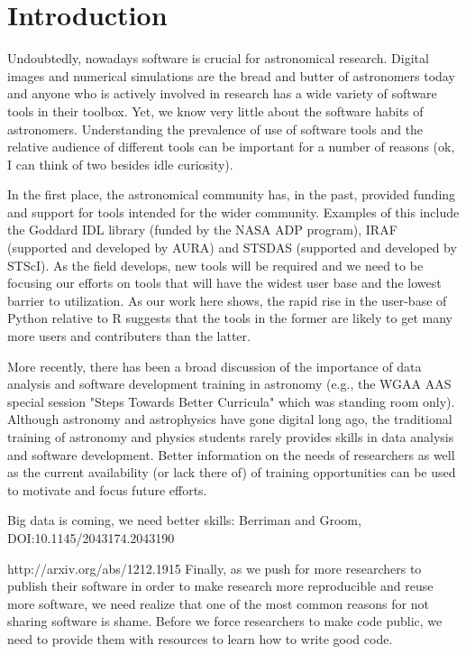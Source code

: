 \section{Introduction}

Undoubtedly, nowadays software is crucial for astronomical research. Digital images and numerical simulations are the bread and butter of astronomers today and anyone who is actively involved in research has a wide variety of software tools in their toolbox. Yet, we know very little about the software habits of astronomers. Understanding the prevalence of use of software tools and the relative audience of different tools can be important for a number of reasons (ok, I can think of two besides idle curiosity).

In the first place, the astronomical community has, in the past, provided funding and support for tools intended for the wider community. Examples of this include the Goddard IDL library (funded by the NASA ADP program), IRAF (supported and developed by AURA) and STSDAS (supported and developed by STScI). As the field develops, new tools will be required and we need to be focusing our efforts on tools that will have the widest user base and the lowest barrier to utilization. As our work here shows, the rapid rise in the user-base of Python relative to R suggests that the tools in the former are likely to get many more users and contributers than the latter. 

More recently, there has been a broad discussion of the importance of data analysis and software development training in astronomy (e.g., the WGAA AAS special session "Steps Towards Better Curricula" which was standing room only). Although astronomy and astrophysics have gone digital long ago, the traditional training of astronomy and physics students rarely provides skills in data analysis and software development. Better information on the needs of researchers as well as the current availability (or lack there of) of training opportunities can be used to motivate and focus future efforts. 

Big data is coming, we need better skills: Berriman and Groom, DOI:10.1145/2043174.2043190

http://arxiv.org/abs/1212.1915
Finally, as we push for more researchers to publish their software in order to make research more reproducible and reuse more software, we need realize that one of the most common reasons for not sharing software is shame. Before we force researchers to make code public, we need to provide them with resources to learn how to write good code. 

